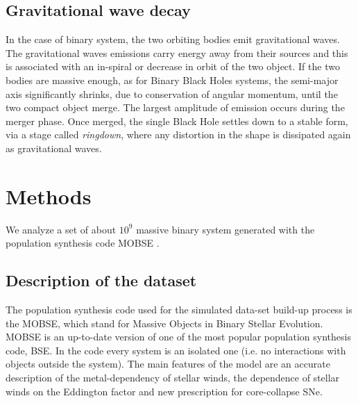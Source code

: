 \documentclass[prb,twocolumn,9pt]{revtex4-1}
\begin{document}
\subsection{Gravitational wave decay}
In the case of binary system, the two orbiting bodies emit gravitational waves. The gravitational waves emissions carry energy away from their sources and this is associated with an in-spiral or decrease in orbit of the two object.
If the two bodies are massive enough, as for Binary Black Holes systems, the semi-major axis significantly shrinks, due to conservation of angular momentum, until the two compact object merge. The largest amplitude of emission occurs during the merger phase.
Once merged, the single Black Hole settles down to a stable form, via a stage called \textit{ringdown}, where any distortion in the shape is dissipated again as gravitational waves.

\section{Methods}
We analyze a set of about \(10^9\) massive binary system generated with the population synthesis code MOBSE \cite{2018MNRAS.474.2959G}. 

\subsection{Description of the dataset}
The population synthesis code used for the simulated data-set build-up process is the MOBSE, which stand for Massive Objects in Binary Stellar Evolution. MOBSE is an up-to-date version of one of the most popular population synthesis code, BSE. In the code every system is an isolated one (i.e. no interactions with objects outside the system). The main features of the model are an accurate description of the metal-dependency of stellar winds, the dependence of stellar winds on the Eddington factor and new prescription for core-collapse SNe.
\end{document}
